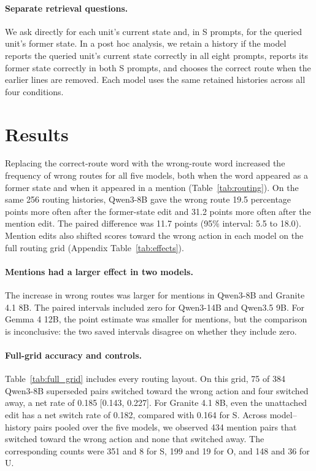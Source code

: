\documentclass[letterpaper]{article}
\begin{document}
\paragraph{Separate retrieval questions.}
We ask directly for each unit's current state and, in S prompts, for the queried unit's former state. In a post hoc analysis, we retain a history if the model reports the queried unit's current state correctly in all eight prompts, reports its former state correctly in both S prompts, and chooses the correct route when the earlier lines are removed. Each model uses the same retained histories across all four conditions.


\section{Results}
Replacing the correct-route word with the wrong-route word increased the frequency of wrong routes for all five models, both when the word appeared as a former state and when it appeared in a mention (Table~\ref{tab:routing}). On the same 256 routing histories, Qwen3-8B gave the wrong route 19.5 percentage points more often after the former-state edit and 31.2 points more often after the mention edit. The paired difference was 11.7 points (95\% interval: 5.5 to 18.0). Mention edits also shifted scores toward the wrong action in each model on the full routing grid (Appendix Table~\ref{tab:effects}).

\paragraph{Mentions had a larger effect in two models.}
The increase in wrong routes was larger for mentions in Qwen3-8B and Granite 4.1 8B. The paired intervals included zero for Qwen3-14B and Qwen3.5 9B. For Gemma 4 12B, the point estimate was smaller for mentions, but the comparison is inconclusive: the two saved intervals disagree on whether they include zero.

\paragraph{Full-grid accuracy and controls.}
Table~\ref{tab:full_grid} includes every routing layout. On this grid, 75 of 384 Qwen3-8B superseded pairs switched toward the wrong action and four switched away, a net rate of 0.185 [0.143, 0.227]. For Granite 4.1 8B, even the unattached edit has a net switch rate of 0.182, compared with 0.164 for S. Across model--history pairs pooled over the five models, we observed 434 mention pairs that switched toward the wrong action and none that switched away. The corresponding counts were 351 and 8 for S, 199 and 19 for O, and 148 and 36 for U.
\end{document}
